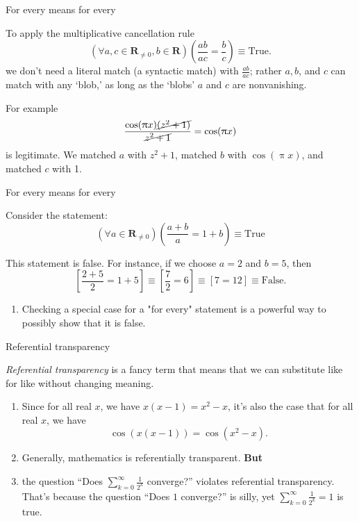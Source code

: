 \documentclass[portrait,fleqn,12pt]{beamer}
\newcommand{\reals}{\mathbf{R}}
\newenvironment{handlist}
   {\begin{enumerate}[\faHandPointRight]
       \addtolength{\itemsep}{0.0\itemsep}}
     {\end{enumerate}}
\begin{document}
\begin{frame}{For every means for every}

To apply the multiplicative cancellation rule
\begin{equation*} 
   \left(\forall a, c\in \reals_{\neq 0}, b \in \reals \right)\left(\frac{a b}{a c} = \frac{b}{c} \right) \equiv \text{True}.
  \end{equation*}
 we don't need a literal match (a syntactic match) with $\frac{a b}{a c}$; rather $a,b$, and $c$ can match with any `blob,'  as long as
 the `blobs'  $a$ and $c$ are nonvanishing.
 
For example
\begin{equation*}
   \frac{ \cos(\uppi x) \cancel{ (z^2 + 1)}}{ \cancel{z^2 + 1} } =  \cos(\uppi x)
\end{equation*}
is legitimate.  We matched $a$ with $z^2 + 1$,  matched $b$ with $ \cos(\uppi x) $, and matched $c$ with 1.


\end{frame}
\begin{frame}{For every means for every}

Consider the statement:
\begin{equation*}
  \left(\forall a \in \reals_{\neq 0} \right)\left(\frac{a+b}{a} = 1 + b \right) \equiv \text{True}
\end{equation*}

This statement is false. For instance, if we choose $a=2$ and $b=5$, then
\begin{equation*}
    \left[ \frac{2+5}{2} = 1+5 \right] \equiv   \left[ \frac{7}{2} = 6 \right]  \equiv \left[ 7 = 12\right]  \equiv \text{False}.
\end{equation*}

\begin{handlist}
\item Checking a special case for a "for every" statement is a powerful way to possibly show that it is false.
\end{handlist}

\end{frame}

\begin{frame}{Referential transparency}

\emph{Referential transparency} is a fancy term that means that we can substitute like for like without changing meaning.  

\begin{handlist}
\item Since for all real $x$, we have $x (x-1) = x^2 -x$, it's also the case that for all real $x$, we have
$$
  \cos(x (x-1)) = \cos(x^2 - x).
$$

\item Generally, mathematics is referentially transparent.  \textbf{But}

\item the question ``Does $\sum_{k=0}^\infty \frac{1}{2^k}$ converge?'' violates referential transparency. That's because
the question ``Does  $1 $ converge?'' is silly, yet  $\sum_{k=0}^\infty \frac{1}{2^k} = 1$ is true.
\end{handlist}

\end{frame}
\end{document}
